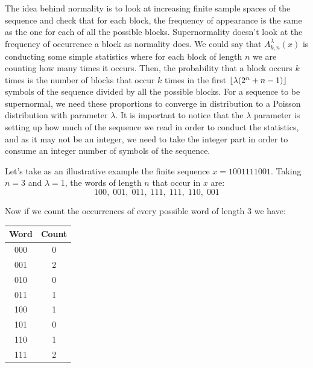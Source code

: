 \documentclass[11pt,a4paper]{tesis}
\DeclarePairedDelimiter{\floor}{\lfloor}{\rfloor}
\begin{document}
The idea behind normality is to look at increasing finite sample spaces of the sequence and check that for each block, the frequency of appearance is the same as the one for each of all the possible blocks.
Supernormality doesn't look at the frequency of occurrence a block as normality does. We could say that $A^\lambda_{k,n}(x)$ is conducting some simple statistics where for each block of length $n$ we are counting how many times it occurs. 
 Then, the probability that a block occurs $k$ times is the number of blocks that occur $k$ times in the first $\floor{\lambda(2^n + n - 1)}$ symbols of the sequence divided by all the possible blocks.
For a sequence to be supernormal, we need these proportions to converge in distribution to a Poisson distribution with parameter $\lambda$. 
It is important to notice that the $\lambda$ parameter is setting up how much of the sequence we read in order to conduct the statistics, and as it may not be an integer, we need to take the integer part in order to consume an integer number of symbols of the sequence.


Let's take as an illustrative example the finite sequence $x = 1001111001$. Taking $n=3$ and $\lambda = 1$, the words of length $n$ that occur in $x$ are:
$$100, \; 001, \; 011,\; 111,\; 111,\; 110,\; 001$$

Now if we count the occurrences of every possible word of length $3$ we have:

\begin{center}
    \begin{tabular}{|c | c|} 
    \hline
    Word & Count \\ [0.5ex] 
    \hline
    000 & 0 \\ 
    \hline
    001 & 2 \\ 
    \hline
    010 & 0 \\ 
    \hline
    011 & 1 \\ 
    \hline
    100 & 1 \\ 
    \hline
    101 & 0 \\ 
    \hline
    110 & 1 \\ 
    \hline
    111 & 2 \\ 
    \hline
   \end{tabular}
\end{center}
\end{document}
